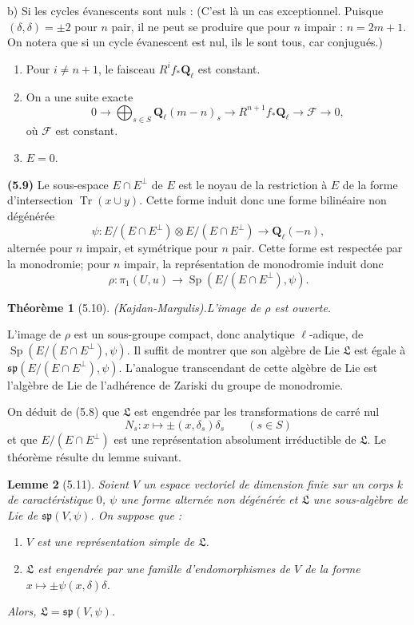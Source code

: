 \documentclass[12pt,a4paper]{amsart}
\theoremstyle{plain}
\newtheorem{theoreme}{Th\'eor\`eme}[section]
\newtheorem{lemme}[theoreme]{Lemme}
\theoremstyle{definition}
\theoremstyle{remark}
\DeclareMathOperator{\Tr}{Tr}
\DeclareMathOperator{\Sp}{Sp}
\newcommand{\Q}{\mathbf{Q}}
\numberwithin{equation}{section}
\begin{document}
b) Si les cycles \'evanescents sont nuls : (C'est l\`a un cas exceptionnel. Puisque $(\delta,\delta)=\pm 2$ pour $n$ pair, il ne peut se produire que pour $n$ impair : $n=2m+1$. On notera que si un cycle \'evanescent est nul, ils le sont tous, car conjugu\'es.)
\begin{enumerate}
\item[1)] Pour $i\not=n+1$, le faisceau $R^i f_\ast\Q_\ell$ est constant.
\item[2)] On a une suite exacte
\[
0 \longrightarrow \bigoplus_{s\in S} \Q_\ell(m-n)_s \longrightarrow R^{n+1} f_\ast\Q_\ell \longrightarrow \mathscr{F} \longrightarrow 0,
\]
o\`u $\mathscr{F}$ est constant.
\item[3)] $E=0$.
\end{enumerate}

\noindent \textbf{(5.9)} Le sous-espace $E\cap E^\perp$ de $E$ est le noyau de la restriction \`a $E$ de la forme d'intersection $\Tr(x\cup y)$. Cette forme induit donc une forme bilin\'eaire non d\'eg\'en\'er\'ee
\[
\psi : E/(E\cap E^\perp) \otimes E/(E\cap E^\perp) \longrightarrow \Q_\ell(-n),
\]
altern\'ee pour $n$ impair, et sym\'etrique pour $n$ pair. Cette forme est respect\'ee par la monodromie; pour $n$ impair, la repr\'esentation de monodromie induit donc
\[
\rho : \pi_1(U,u) \longrightarrow \Sp(E/(E\cap E^\perp),\psi).
\]

\begin{theoreme}[5.10] (Kajdan-Margulis).\label{thm:5.10}
L'image de $\rho$ est ouverte.
\end{theoreme}

L'image de $\rho$ est un sous-groupe compact, donc analytique $\ell$-adique, de $\Sp(E/(E\cap E^\perp),\psi)$. Il suffit de montrer que son alg\`ebre de Lie $\mathfrak{L}$ est \'egale \`a $\mathfrak{sp}(E/(E\cap E^\perp),\psi)$. L'analogue transcendant de cette alg\`ebre de Lie est l'alg\`ebre de Lie de l'adh\'erence de Zariski du groupe de monodromie.

On d\'eduit de (5.8) que $\mathfrak{L}$ est engendr\'ee par les transformations de carr\'e nul
\[
N_s : x \longmapsto \pm(x,\delta_s)\delta_s \qquad (s\in S)
\]
et que $E/(E\cap E^\perp)$ est une repr\'esentation absolument irr\'eductible de $\mathfrak{L}$. Le th\'eor\`eme r\'esulte du lemme suivant.

\begin{lemme}[5.11]\label{lem:5.11}
Soient $V$ un espace vectoriel de dimension finie sur un corps $k$ de caract\'eristique $0$, $\psi$ une forme altern\'ee non d\'eg\'en\'er\'ee et $\mathfrak{L}$ une sous-alg\`ebre de Lie de $\mathfrak{sp}(V,\psi)$. On suppose que :
\begin{enumerate}
\item[(i)] $V$ est une repr\'esentation simple de $\mathfrak{L}$.
\item[(ii)] $\mathfrak{L}$ est engendr\'ee par une famille d'endomorphismes de $V$ de la forme $x\mapsto\pm\psi(x,\delta)\delta$.
\end{enumerate}
Alors, $\mathfrak{L}=\mathfrak{sp}(V,\psi)$.
\end{lemme}
\end{document}
